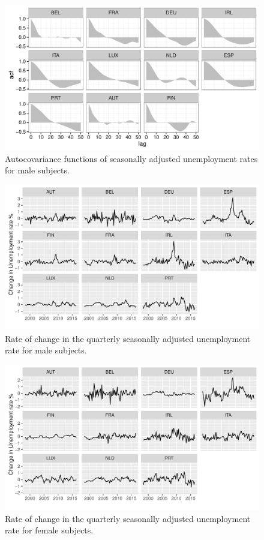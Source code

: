\documentclass[12pt,a4paper,english]{article}
\begin{document}
\begin{appendices}
\begin{figure}[H]
\centering
\includegraphics[width=0.8\linewidth]{Graphs/STSA_MA_ACF_facet}
\caption{Autocovariance functions of seasonally adjusted unemployment rates for male subjects.\cite{oecdLFS}}
\label{STSA_MA_ACF_facet}
\end{figure}

\begin{figure}[H]
\centering
\includegraphics[width=0.8\linewidth]{Graphs/STSA_MA_diff_facet}
\caption{Rate of change in the quarterly seasonally adjusted unemployment rate for male subjects.\cite{oecdLFS}}
\label{STSA_MA_diff_facet}
\end{figure}

\begin{figure}[H]
\centering
\includegraphics[width=0.8\linewidth]{Graphs/STSA_FE_diff_facet}
\caption{Rate of change in the quarterly seasonally adjusted unemployment rate for female subjects.\cite{oecdLFS}}
\label{STSA_FE_diff_facet}
\end{figure}


\end{appendices}
\end{document}
